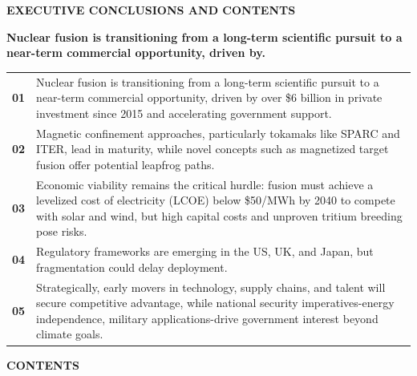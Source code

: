 \documentclass[10pt,a4paper]{article}
\begin{document}
{\textcolor{BOBlue}{\scriptsize\bfseries EXECUTIVE CONCLUSIONS AND CONTENTS}}\par\vspace{-1pt}
{\Large\sffamily\bfseries\color{BONavy} Nuclear fusion is transitioning from a long-term scientific pursuit to a near-term commercial opportunity, driven by.}\par\vspace{4pt}
\vspace{2pt}{\color{BOBright}\rule{\linewidth}{1pt}}\vspace{5pt}
\begin{tabularx}{\linewidth}{p{12mm}Y}
\textcolor{BOBlue}{\bfseries 01} & {\footnotesize Nuclear fusion is transitioning from a long-term scientific pursuit to a near-term commercial opportunity, driven by over \$6 billion in private investment since 2015 and accelerating government support.} \\[4pt]
\textcolor{BOBlue}{\bfseries 02} & {\footnotesize Magnetic confinement approaches, particularly tokamaks like SPARC and ITER, lead in maturity, while novel concepts such as magnetized target fusion offer potential leapfrog paths.} \\[4pt]
\textcolor{BOBlue}{\bfseries 03} & {\footnotesize Economic viability remains the critical hurdle: fusion must achieve a levelized cost of electricity (LCOE) below \$50/MWh by 2040 to compete with solar and wind, but high capital costs and unproven tritium breeding pose risks.} \\[4pt]
\textcolor{BOBlue}{\bfseries 04} & {\footnotesize Regulatory frameworks are emerging in the US, UK, and Japan, but fragmentation could delay deployment.} \\[4pt]
\textcolor{BOBlue}{\bfseries 05} & {\footnotesize Strategically, early movers in technology, supply chains, and talent will secure competitive advantage, while national security imperatives-energy independence, military applications-drive government interest beyond climate goals.} \\[4pt]
\end{tabularx}
\vspace{6pt}
{\textcolor{BOBlue}{\scriptsize\bfseries CONTENTS}}\par\vspace{2pt}
\end{document}
